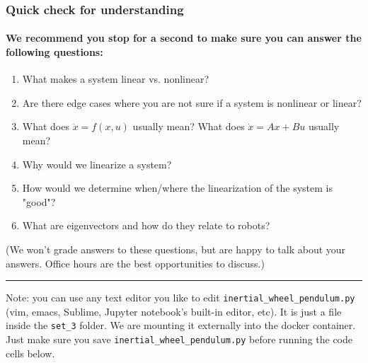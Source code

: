 \documentclass[11pt]{article}
\begin{document}
\subsubsection{Quick check for
understanding}\label{quick-check-for-understanding}

\paragraph{We recommend you stop for a second to make sure you can
answer the following
questions:}\label{we-recommend-you-stop-for-a-second-to-make-sure-you-can-answer-the-following-questions}

\begin{enumerate}
\def\labelenumi{\arabic{enumi}.}
\item
  What makes a system linear vs. nonlinear?
\item
  Are there edge cases where you are not sure if a system is nonlinear
  or linear?
\item
  What does \(\dot{x} = f(x,u)\) usually mean? What does
  \(\dot{x} = Ax + Bu\) usually mean?
\item
  Why would we linearize a system?
\item
  How would we determine when/where the linearization of the system is
  "good"?
\item
  What are eigenvectors and how do they relate to robots?
\end{enumerate}

(We won't grade answers to these questions, but are happy to talk about
your answers. Office hours are the best opportunities to discuss.)

\begin{center}\rule{0.5\linewidth}{\linethickness}\end{center}

    Note: you can use any text editor you like to edit
\texttt{inertial\_wheel\_pendulum.py} (vim, emacs, Sublime, Jupyter
notebook's built-in editor, etc). It is just a file inside the
\texttt{set\_3} folder. We are mounting it externally into the docker
container. Just make sure you save \texttt{inertial\_wheel\_pendulum.py}
before running the code cells below.
\end{document}
